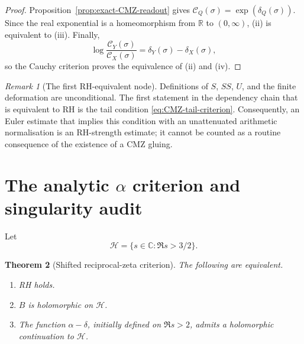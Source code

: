 \documentclass[11pt]{amsart}
\numberwithin{equation}{section}
\theoremstyle{plain}
\newtheorem{theorem}{Theorem}[section]
\theoremstyle{definition}
\theoremstyle{remark}
\newtheorem{remark}[theorem]{Remark}
\newcommand{\C}{\mathbb C}
\newcommand{\R}{\mathbb R}
\begin{document}
\begin{proof}
Proposition~\ref{prop:exact-CMZ-readout} gives
$\mathscr C_Q(\sigma)=\exp(\delta_Q(\sigma))$.  Since the real exponential
is a homeomorphism from $\R$ to $(0,\infty)$, (ii) is equivalent to (iii).
Finally,
\begin{equation}
\log\frac{\mathscr C_Y(\sigma)}{\mathscr C_X(\sigma)}
=\delta_Y(\sigma)-\delta_X(\sigma),
\label{eq:tail-log-delta}
\end{equation}
so the Cauchy criterion proves the equivalence of (ii) and (iv).
\end{proof}

\begin{remark}[The first RH-equivalent node]
\label{rem:first-equivalent-node}
Definitions of $S$, $SS$, $U$, and the finite deformation are unconditional.
The first statement in the dependency chain that is equivalent to RH is the
tail condition \eqref{eq:CMZ-tail-criterion}.  Consequently, an Euler estimate
that implies this condition with an unattenuated arithmetic normalisation is
an RH-strength estimate; it cannot be counted as a routine consequence of
the existence of a CMZ gluing.
\end{remark}

\section{The analytic \texorpdfstring{$\alpha$}{alpha} criterion and singularity audit}
\label{sec:analytic-criterion}

Let
\begin{equation}
\mathcal H=\{s\in\C:\Re s>3/2\}.
\label{eq:H-half-plane}
\end{equation}

\begin{theorem}[Shifted reciprocal-zeta criterion]
\label{thm:analytic-alpha-criterion}
The following are equivalent.
\begin{enumerate}[label=\textup{(\roman*)},leftmargin=*]
\item RH holds.
\item $B$ is holomorphic on $\mathcal H$.
\item The function $\alpha-\delta$, initially defined on $\Re s>2$, admits a
holomorphic continuation to $\mathcal H$.
\end{enumerate}
\end{theorem}
\end{document}
